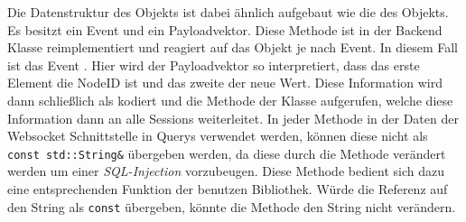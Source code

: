 Die Datenstruktur des  Objekts ist dabei ähnlich aufgebaut wie die des  Objekts.
Es besitzt ein Event und ein Payloadvektor.
Diese Methode  ist in der Backend Klasse reimplementiert und reagiert auf das  Objekt je nach Event.
In diesem Fall ist das Event . Hier wird der Payloadvektor so interpretiert, dass das erste Element die NodeID ist und das zweite der neue Wert.
Diese Information wird dann schließlich als  kodiert und die Methode  der  Klasse aufgerufen, 
welche diese Information dann an alle Sessions weiterleitet.
In jeder Methode in der Daten der Websocket Schnittstelle in Querys verwendet werden, können diese nicht als \texttt{const std::String&} übergeben werden, da diese durch die Methode  verändert werden um einer \emph{SQL-Injection} vorzubeugen.
Diese Methode bedient sich dazu eine entsprechenden Funktion der benutzen Bibliothek.
Würde die Referenz auf den String als \texttt{const} übergeben, könnte die Methode den String nicht verändern.



